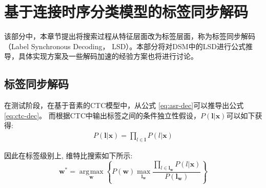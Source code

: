 \section{基于连接时序分类模型的标签同步解码}
\label{chap:lsd-ctc}


该部分中，本章节提出将搜索过程从特征层面改为标签层面，称为标签同步解码（Label Synchronous Decoding， LSD）。本部分将对DSM中的LSD进行公式推导，具体实现方案及一些解码加速的经验方案也将进行讨论。

\subsection{标签同步解码}
\label{chap:lsd-lsd-ctc-method}
在测试阶段，在基于音素的CTC模型中，从公式 \ref{eq:asr-dec}可以推导出公式\ref{eq:ctc-dec}。 而根据CTC中输出标签之间的条件独立性假设，$P(\mathbf{l}|\mathbf{x})$可以如下获得:
\begin{equation} \label{eq:indep-output-ctc}
  \begin{split}
        P(\mathbf{l}|\mathbf{x}) 
        = \prod_{l\in\mathbf{l}} P(l|\mathbf{x}) \end{split}
       \end{equation}

因此在标签级别上, 维特比搜索如下所示:
\begin{equation} \label{eq:ctc-dec-lsd}
   \mathbf{w}^* = \mathop{\arg\!\max}\limits_\mathbf{w} \left\{
        P(\mathbf{w})
        \mathop{\max}\limits_{\mathbf{l}_\mathbf{w}} \frac{ \prod_{l\in\mathbf{l}_\mathbf{w}} P(l|\mathbf{x}) }{P(\mathbf{l}_\mathbf{w})}\right\}
     \end{equation}

